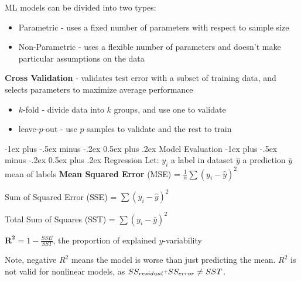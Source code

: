 \documentclass[10pt,landscape]{article}
\makeatletter
\newcommand{\plus}{\raisebox{.3\height}{\scalebox{.7}{+}}}
\renewcommand{\section}{\@startsection{section}{1}{0mm}%
                                {-1ex plus -.5ex minus -.2ex}%
                                {0.5ex plus .2ex}%
                                {\normalfont\large\bfseries}}
\renewcommand{\subsection}{\@startsection{subsection}{2}{0mm}%
                                {-1ex plus -.5ex minus -.2ex}%
                                {0.5ex plus .2ex}%
                                {\normalfont\normalsize\bfseries}}
\makeatother
\begin{document}
\begin{multicols}{3}
    \vspace{.5mm}
    ML models can be divided into two types:
    \vspace{-.5mm}
    \begin{itemize}[label={--},leftmargin=4mm]
        \itemsep -.4mm
        \item Parametric - uses a fixed number of parameters with respect to sample size
        \item Non-Parametric - uses a flexible number of parameters and doesn't make particular assumptions on the data
    \end{itemize}

    \textbf{Cross Validation} - validates test error with a subset of training data, and selects parameters to maximize average performance
    \begin{itemize}[label={--},leftmargin=4mm]
        \itemsep -.4mm
              \vspace{-1mm}
        \item $k$-fold - divide data into $k$ groups, and use one to validate
        \item leave-$p$-out  - use $p$ samples to validate and the rest to train
    \end{itemize}

    \section{Model Evaluation}
    \subsection{Regression}
    Let: 
    $y_i$ a label in dataset
    $\hat{y}$ a prediction
    $\bar{y}$ mean of labels
    \textbf{Mean Squared Error} (MSE) = $\frac{1}{n}\sum (y_i -\hat{y})^2$
    \vspace{.1em}

    Sum of Squared Error (SSE) = $\sum (y_i - \hat{y})^2$

    Total Sum of Squares (SST) = $\sum (y_i - \bar{y})^2$
    \vspace{.1em}

    $\boldsymbol{R^2} = 1 - \frac{SSE}{SST}$, the proportion of explained $y$-variability

    Note, negative $R^2$ means the model is worse than just predicting the mean. $R^2$ is not valid for nonlinear models, as $SS_{residual } \plus SS_{error} \neq SST$.



\end{multicols}
\end{document}
